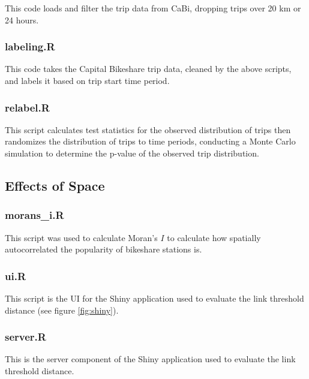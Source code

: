 \documentclass[letterpaper,11pt]{article}
\begin{document}
This code loads and filter the trip data from CaBi, dropping trips
over 20 km or 24 hours.



\subsubsection{labeling.R}
\label{labeling.R}

This code takes the Capital Bikeshare trip data, cleaned by the above
scripts, and labels it based on trip start time period.



\subsubsection{relabel.R}
\label{relabel.R}

This script calculates test statistics for the observed distribution
of trips then randomizes the distribution of trips to time periods,
conducting a Monte Carlo simulation to determine the p-value of the
observed trip distribution.



\subsection{Effects of Space}
\subsubsection{morans\_i.R}
\label{morans_i.R}

This script was used to calculate Moran's $I$ to calculate how
spatially autocorrelated the popularity of bikeshare stations is.



\subsubsection{ui.R}
\label{ui.R}

This script is the UI for the Shiny application used to evaluate the
link threshold distance (see figure \ref{fig:shiny}).



\subsubsection{server.R}

This is the server component of the Shiny application used to evaluate
the link threshold distance.


\end{document}
